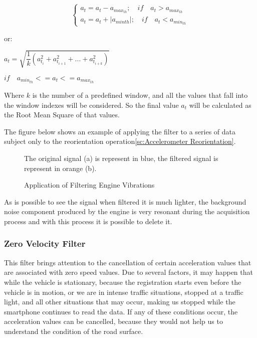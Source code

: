 \documentclass[tesi]{subfiles}
\begin{document}
\begin{center}
\[
    \left\{
                \begin{array}{ll}
                  a_{t} = a_{t} - a_{max_{th}}; \quad 	if \quad a_{t} > a_{max_{th}}\\
              	  a_{t} = a_{t} + |a_{min{th}}|; \quad  if \quad a_{t} < a_{min_{th}}
                \end{array}
              \right.
\]
\end{center}
or:
\begin{center}
$a_{t} = \sqrt{\dfrac{1}{k} (a_{t_{i}}^{2} + a_{t_{i+1}}^{2} + ... + a_{t_{i+k}}^{2} )} $\\
\end{center}
\begin{center}
$if\quad  a_{min_{th}} <= a_{t} <= a_{max_{th}} $


Where $k$ is the number of a predefined window, and all the values that fall into the window indexes will be considered.
So the final value $a_{t}$ will be calculated as the Root Mean Square of that values.
\end{center}

The figure below shows an example of applying the filter to a series of data subject only to the reorientation operation\ref{sc:Accelerometer Reorientation}.

\vspace{0.5cm}
\begin{figure}[H]	


\centering
{}

The original signal (a) is represent in blue, the filtered signal is represent in orange (b).
 \caption{Application of Filtering Engine Vibrations}
  \label{fig:Application of Engine Vibrations Filter.}
\end{figure}
As is possible to see the signal when filtered it is much lighter, the background noise component produced by the engine is very resonant during the acquisition process and with this process it is possible to delete it.

\subsubsection{Zero Velocity Filter}\label{sssc:Zero Velocity Filter}
This filter brings attention to the cancellation of certain acceleration values that are associated with zero speed values. Due to several factors, it may happen that while the vehicle is stationary,  because the registration starts even before the vehicle is in motion, or we are in intense traffic situations, stopped at a traffic light, and all other situations that may occur, making us stopped while the smartphone continues to read the data. If any of these conditions occur, the acceleration values can be cancelled, because they would not help us to understand the condition of the road surface.
\end{document}
